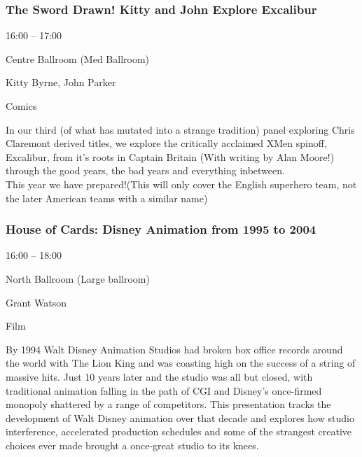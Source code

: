 \documentclass{scrreprt}
\begin{document}
\begin{multicols}{2}
\subsubsection*{The Sword Drawn! Kitty and John Explore Excalibur}\begin{description}
\setlength{\itemsep}{0pt}
\setlength{\parsep}{0pt}
\setlength{\parskip}{0pt}
\item[Time:]{16:00 -- 17:00}
\item[Venue:]{Centre Ballroom (Med Ballroom)}
\item[People:]{Kitty Byrne, John Parker}
\item[Tags:]{Comics}\end{description}
In our third (of what has mutated into a strange tradition) panel exploring Chris Claremont derived titles, we explore the critically acclaimed XMen spinoff, Excalibur, from it's roots in Captain Britain (With writing by Alan Moore!) through the good years, the bad years and everything inbetween. \\This year we have prepared!(This will only cover the English superhero team, not the later American teams with a similar name)
\subsubsection*{House of Cards: Disney Animation from 1995 to 2004}\begin{description}
\setlength{\itemsep}{0pt}
\setlength{\parsep}{0pt}
\setlength{\parskip}{0pt}
\item[Time:]{16:00 -- 18:00}
\item[Venue:]{North Ballroom (Large ballroom)}
\item[People:]{Grant Watson}
\item[Tags:]{Film}\end{description}
By 1994 Walt Disney Animation Studios had broken box office records around the world with The Lion King and was coasting high on the success of a string of massive hits. Just 10 years later and the studio was all but closed, with traditional animation falling in the path of CGI and Disney’s once-firmed monopoly shattered by a range of competitors. This presentation tracks the development of Walt Disney animation over that decade and explores how studio interference, accelerated production schedules and some of the strangest creative choices ever made brought a once-great studio to its knees.

\end{multicols}
\end{document}
